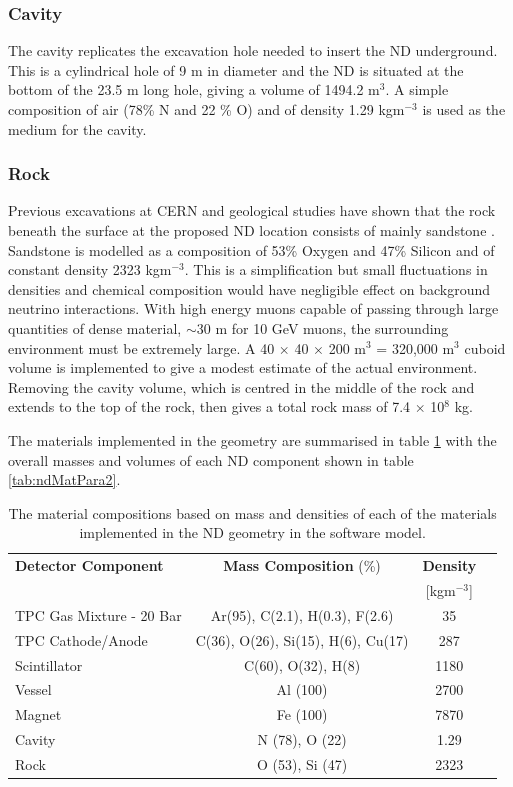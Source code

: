 \subsubsection{Cavity}
The cavity replicates the excavation hole needed to insert the ND underground. This is a cylindrical hole of 9 m in diameter and the ND is situated at the bottom of the 23.5 m long hole, giving a volume of 1494.2 m$^{3}$. A simple composition of air (78\% N and 22 \% O) and of density 1.29 kgm$^{-3}$ is used as the medium for the cavity.

\subsubsection{Rock}
Previous excavations at CERN and geological studies have shown that the rock beneath the surface at the proposed ND location consists of mainly sandstone \cite{sandstone}. Sandstone is modelled as a composition of 53\% Oxygen and 47\% Silicon and of constant density 2323 kgm$^{-3}$. This is a simplification but small fluctuations in densities and chemical composition would have negligible effect on background neutrino interactions. With high energy muons capable of passing through large quantities of dense material, $\sim$30 m for 10 GeV muons, the surrounding environment must be extremely large. A 40 $\times$ 40 $\times$ 200 m$^{3}$ = 320,000 m$^{3}$ cuboid volume is implemented to give a modest estimate of the actual environment. Removing the cavity volume, which is centred in the middle of the rock and extends to the top of the rock, then gives a total rock mass of 7.4 $\times$ 10$^{8}$ kg.

The materials implemented in the geometry are summarised in table \ref{tab:ndMatPara} with the overall masses and volumes of each ND component shown in table \ref{tab:ndMatPara2}.

\begin{table}[h]
\centering
\begin{tabular}{lccc}
	\hline
	\textbf{Detector Component} & \textbf{Mass Composition} (\%) & \textbf{Density} \\
	& & [kgm$^{-3}$]  	\\
	\hline
	TPC Gas Mixture - 20 Bar	& Ar(95), C(2.1), H(0.3), F(2.6) & 35  \\
	TPC Cathode/Anode & C(36), O(26), Si(15), H(6), Cu(17) & 287  \\
	Scintillator	 & C(60), O(32), H(8) & 1180  	\\
	Vessel &	Al (100) &	2700	 \\
	Magnet &	Fe (100)  & 7870 \\
	Cavity &N (78), O (22) & 1.29 \\
	Rock & O (53), Si (47) & 2323 \\
	\hline
\end{tabular}
\caption{The material compositions based on mass and densities of each of the materials implemented in the ND geometry in the software model.}
\label{tab:ndMatPara}
\end{table}

